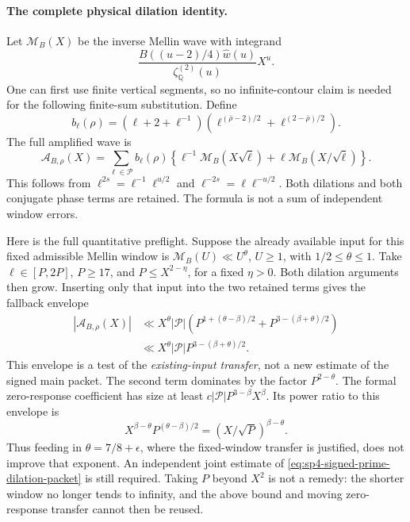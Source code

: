 \paragraph{The complete physical dilation identity.}
Let \(\mathcal M_B(X)\) be the inverse Mellin wave with integrand
\[
 \frac{B((u-2)/4)\widehat w(u)}{\zeta_{\mathbb Q}^{(2)}(u)}X^u.
\]
One can first use finite vertical segments, so no infinite-contour
claim is needed for the following finite-sum substitution. Define
\[
 b_\ell(\rho)=(\ell+2+\ell^{-1})
       (\ell^{(\bar\rho-2)/2}+\ell^{(2-\bar\rho)/2}).
\]
The full amplified wave is
\begin{equation}\label{eq:sp4-signed-prime-dilation-packet}
 \mathcal A_{B,\rho}(X)=
 \sum_{\ell\in\mathcal P} b_\ell(\rho)
 \left\{\ell^{-1}\mathcal M_B(X\sqrt\ell)
                  +\ell\mathcal M_B(X/\sqrt\ell)\right\}.
\end{equation}
This follows from \(\ell^{2s}=\ell^{-1}\ell^{u/2}\) and
\(\ell^{-2s}=\ell\ell^{-u/2}\). Both dilations and both
conjugate phase terms are retained. The formula is not a sum of
independent window errors.

Here is the full quantitative preflight. Suppose the already available
input for this fixed admissible Mellin window is
\(\mathcal M_B(U)\ll U^\theta\), \(U\ge1\), with
\(1/2\le\theta\le1\). Take \(\ell\in[P,2P]\), \(P\ge17\),
and \(P\le X^{2-\eta}\), for a fixed \(\eta>0\). Both dilation
arguments then grow. Inserting only that input into the two retained
terms gives the fallback envelope
\begin{align*}
 |\mathcal A_{B,\rho}(X)|
 &\ll X^\theta |\mathcal P|
   \left(P^{1+(\theta-\beta)/2}
                 +P^{3-(\beta+\theta)/2}\right)\\
 &\ll X^\theta |\mathcal P|P^{3-(\beta+\theta)/2}.
\end{align*}
This envelope is a test of the \emph{existing-input transfer}, not
a new estimate of the signed main packet. The second term dominates
by the factor \(P^{2-\theta}\). The formal zero-response coefficient
has size at least
\(c|\mathcal P|P^{3-\beta}X^\beta\). Its power ratio to this
envelope is
\begin{equation}\label{eq:sp4-hecke-no-free-boundary-change}
 X^{\beta-\theta}P^{(\theta-\beta)/2}
       =(X/\sqrt P)^{\beta-\theta}.
\end{equation}
Thus feeding in \(\theta=7/8+\epsilon\), where the fixed-window
transfer is justified, does not improve that exponent. An independent
joint estimate of \eqref{eq:sp4-signed-prime-dilation-packet} is still
required. Taking \(P\) beyond \(X^2\) is not a remedy: the shorter
window no longer tends to infinity, and the above bound and moving
zero-response transfer cannot then be reused.

